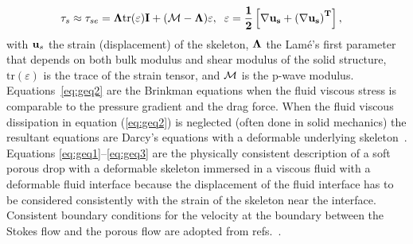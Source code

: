 \documentclass[11pt]{article}
\begin{document}
\begin{align}
\tau_s &\approx \tau_{se} = \bf{\Lambda}\mbox{tr}(\bf{\varepsilon}) \bf{I} + ({\cal M}-\Lambda) \bf{\varepsilon},\;\; 
{\bf \varepsilon} = \frac{1}{2}\left[\nabla {\bf u}_s + \left(\nabla {\bf u}_s\right)^T\right],
\end{align}
with ${\bf u}_s$ the strain (displacement) of the skeleton, ${\bf
\Lambda}$ the Lam\'e's first parameter that depends on both bulk modulus
and shear modulus of the solid structure, $\mbox{tr}(\varepsilon)$ is
the trace of the strain tensor, and ${\cal M}$ is the p-wave modulus.
Equations~\eqref{eq:geq2} are the Brinkman equations when the fluid
viscous stress is comparable to the pressure gradient and the drag
force.  When the fluid viscous dissipation in equation (\ref{eq:geq2})
is neglected (often done in solid mechanics) the resultant equations are
Darcy's equations with a deformable underlying
skeleton~\cite{MacMinn2016_PRApplied}. Equations
\eqref{eq:geq1}--\eqref{eq:geq3} are the physically consistent
description of a soft porous drop with a deformable skeleton immersed in
a viscous fluid with a deformable fluid interface because the
displacement of the fluid interface has to be considered consistently
with the strain of the skeleton near the interface. Consistent boundary
conditions for the velocity at the boundary between the Stokes flow and
the porous flow are adopted from refs.~\cite{Angot2017_PRE,
MacMinn2016_PRApplied}.
\end{document}
